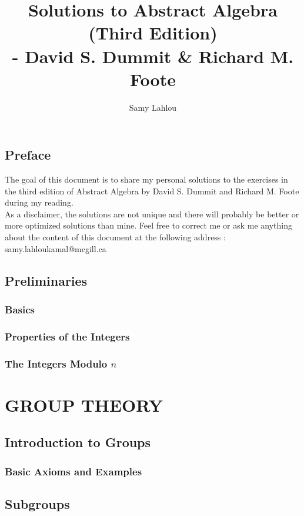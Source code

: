 \documentclass[12pt, oneside]{book}
\title{Solutions to Abstract Algebra (Third Edition)
\\ - David S. Dummit \& Richard M. Foote}
\author{Samy Lahlou}
\newcounter{exercise}[section] %
\begin{document}
\maketitle

\chapter*{Preface}

The goal of this document is to share my personal solutions to the exercises
in the third edition of Abstract Algebra by David S. Dummit and Richard M. Foote
during my reading. \\
As a disclaimer, the solutions are not unique and there will 
probably be better or more optimized solutions than mine. Feel free to 
correct me or ask me anything about the content of this document at the 
following address : samy.lahloukamal@mcgill.ca\\

\tableofcontents

\chapter*{Preliminaries}
\section{Basics}
\section{Properties of the Integers}
\section{The Integers Modulo $n$}

\part{GROUP THEORY}


\chapter{Introduction to Groups}
\section{Basic Axioms and Examples}

\chapter{Subgroups}
\end{document}
